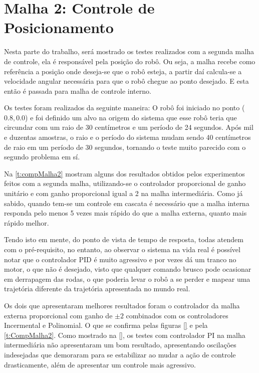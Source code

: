 \section{Malha 2: Controle de Posicionamento}
 \label{m2}
 Nesta parte do trabalho, será mostrado os testes realizados com a segunda malha de controle, ela é responsável pela posição do robô. Ou seja, a malha recebe como referência a posição onde deseja-se que o robô esteja, a partir daí calcula-se a velocidade angular necessária para que o robô chegue ao ponto desejado. E esta então é passada para malha de controle interno. 
 
 Os testes foram realizados da seguinte maneira: O robô foi iniciado no ponto ($0.8,0.0$) e foi definido um alvo na origem do sistema que esse robô teria que circundar com um raio de 30 centímetros e um período de 24 segundos. Após mil e duzentas amostras, o raio e o período do sistema mudam sendo 40 centímetros de raio em um período de 30 segundos, tornando o teste muito parecido com o segundo problema em sí.
 
 Na \autoref{t:compMalha2} mostram alguns dos resultados obtidos pelos experimentos feitos com a segunda malha, utilizando-se o controlador proporcional de ganho unitário e com ganho proporcional igual a 2 na malha intermediária. Como já sabido, quando tem-se um controle em cascata é necessário que a malha interna responda pelo menos 5 vezes mais rápido do que a malha externa, quanto mais rápido melhor.
 
 Tendo isto em mente, %
 do ponto de vista de tempo de resposta, todas atendem com o pré-requisito, no entanto, ao observar o sistema na vida real é possível notar que o controlador PID é muito agressivo e por vezes dá um tranco no motor, o que não é desejado, visto que qualquer comando brusco pode ocasionar em derrapagem das rodas, o que poderia levar o robô a se perder e mapear uma trajetória diferente da trajetória apresentada no mundo real.
 
 Os dois que apresentaram melhores resultados foram o controlador da malha externa proporcional com ganho de $\pm2$ combinados com os controladores Incermental e Polinomial. O que se confirma pelas figuras \ref{} e pela \autoref{t:CompMalha2}. Como mostrado na \autoref{}, os testes com controlador PI na malha intermediária não apresentaram um bom resultado, apresentando oscilações indesejadas que demoraram para se estabilizar ao mudar a ação de controle drasticamente, além de apresentar um controle mais agressivo.
 
